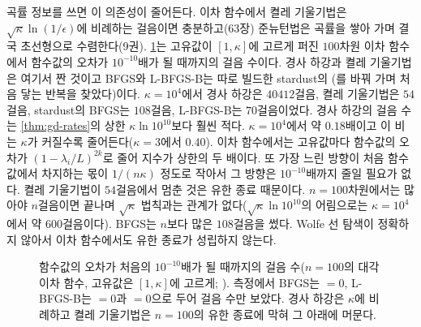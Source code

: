 곡률 정보를 쓰면 이 의존성이 줄어든다. 이차 함수에서 켤레 기울기법은 $\sqrt\kappa\ln(1/\epsilon)$에 비례하는 걸음이면 충분하고(63장) 준뉴턴법은 곡률을 쌓아 가며 결국 초선형으로 수렴한다(9권). \cref{fig:kappa}는 고유값이 $[1,\kappa]$에 고르게 퍼진 $100$차원 이차 함수에서 함수값의 오차가 $10^{-10}$배가 될 때까지의 걸음 수이다. 경사 하강과 켤레 기울기법은 여기서 짠 것이고 BFGS와 L-BFGS-B는 따로 빌드한 stardust의 (를 바꿔 가며 처음 닿는 반복을 찾았다)이다. $\kappa=10^4$에서 경사 하강은 $40412$걸음, 켤레 기울기법은 $54$걸음, stardust의 BFGS는 $108$걸음, L-BFGS-B는 $70$걸음이었다. 경사 하강의 걸음 수는 \cref{thm:gd-rates}의 상한 $\kappa\ln10^{10}$보다 훨씬 적다. $\kappa=10^4$에서 약 $0.18$배이고 이 비는 $\kappa$가 커질수록 줄어든다($\kappa=3$에서 $0.40$). 이차 함수에서는 고유값마다 함수값의 오차가 $(1-\lambda_i/L)^{2k}$로 줄어 지수가 상한의 두 배이다. 또 가장 느린 방향이 처음 함수값에서 차지하는 몫이 $1/(n\kappa)$ 정도로 작아서 그 방향은 $10^{-10}$배까지 줄일 필요가 없다. 켤레 기울기법이 $54$걸음에서 멈춘 것은 유한 종료 때문이다. $n=100$차원에서는 많아야 $n$걸음이면 끝나며 $\sqrt\kappa$ 법칙과는 관계가 없다($\sqrt\kappa\ln10^{10}$의 어림으로는 $\kappa=10^4$에서 약 $600$걸음이다). BFGS는 $n$보다 많은 $108$걸음을 썼다. Wolfe 선 탐색이 정확하지 않아서 이차 함수에서도 유한 종료가 성립하지 않는다.

\begin{figure}[htbp]
\centering
{}
\caption{함수값의 오차가 처음의 $10^{-10}$배가 될 때까지의 걸음 수($n=100$의 대각 이차 함수, 고유값은 $[1,\kappa]$에 고르게; ). 측정에서 BFGS는 $=0$, L-BFGS-B는 $=0$과 $=0$으로 두어 걸음 수만 보았다. 경사 하강은 $\kappa$에 비례하고 켤레 기울기법은 $n=100$의 유한 종료에 막혀 그 아래에 머문다.}
\label{fig:kappa}
\end{figure}

